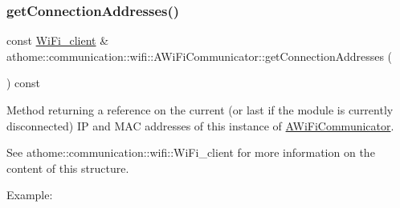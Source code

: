 \subsubsection{\texorpdfstring{get\+Connection\+Addresses()}{getConnectionAddresses()}}
{\footnotesize\ttfamily const \mbox{\hyperlink{structathome_1_1communication_1_1wifi_1_1s__wifi__client}{Wi\+Fi\+\_\+client}} \& athome\+::communication\+::wifi\+::\+A\+Wi\+Fi\+Communicator\+::get\+Connection\+Addresses (\begin{DoxyParamCaption}{ }\end{DoxyParamCaption}) const}

Method returning a reference on the current (or last if the module is currently disconnected) IP and M\+AC addresses of this instance of \mbox{\hyperlink{classathome_1_1communication_1_1wifi_1_1_a_wi_fi_communicator}{A\+Wi\+Fi\+Communicator}}.

See athome\+::communication\+::wifi\+::\+Wi\+Fi\+\_\+client for more information on the content of this structure.

Example\+:


